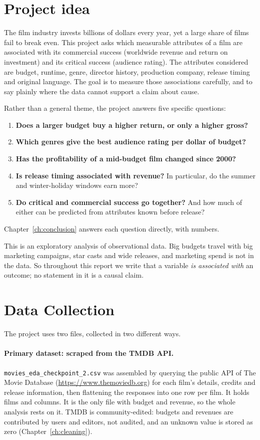 \documentclass[a4paper,12pt]{report}
\newcommand{\code}[1]{\texttt{#1}}
\begin{document}
\section{Project idea}

The film industry invests billions of dollars every year, yet a large share of films fail to break even. This project asks which measurable attributes of a film are associated with its commercial success (worldwide revenue and return on investment) and its critical success (audience rating). The attributes considered are budget, runtime, genre, director history, production company, release timing and original language. The goal is to measure those associations carefully, and to say plainly where the data cannot support a claim about cause.

Rather than a general theme, the project answers five specific questions:

\begin{enumerate}
  \item \textbf{Does a larger budget buy a higher return, or only a higher gross?}
  \item \textbf{Which genres give the best audience rating per dollar of budget?}
  \item \textbf{Has the profitability of a mid-budget film changed since 2000?}
  \item \textbf{Is release timing associated with revenue?} In particular, do the summer and winter-holiday windows earn more?
  \item \textbf{Do critical and commercial success go together?} And how much of either can be predicted from attributes known before release?
\end{enumerate}

Chapter~\ref{ch:conclusion} answers each question directly, with numbers.

This is an exploratory analysis of observational data. Big budgets travel with big marketing campaigns, star casts and wide releases, and marketing spend is not in the data. So throughout this report we write that a variable \emph{is associated with} an outcome; no statement in it is a causal claim.

\section{Data Collection}

The project uses two files, collected in two different ways.

\paragraph{Primary dataset: scraped from the TMDB API.} \code{movies\_eda\_checkpoint\_2.csv} was assembled by querying the public API of The Movie Database (\url{https://www.themoviedb.org}) for each film's details, credits and release information, then flattening the responses into one row per film. It holds \AuditPrimaryRows{} films and \AuditPrimaryCols{} columns. It is the only file with budget and revenue, so the whole analysis rests on it. TMDB is community-edited: budgets and revenues are contributed by users and editors, not audited, and an unknown value is stored as zero (Chapter~\ref{ch:cleaning}).
\end{document}
